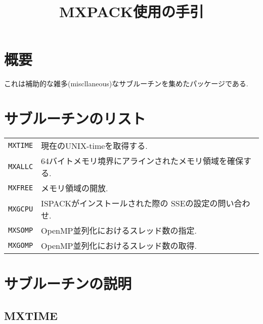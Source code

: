 \documentclass[a4j]{jsarticle}
\title{MXPACK使用の手引}
\author{}
\date{}
\begin{document}
\maketitle

\section{概要}

これは補助的な雑多(miscllaneous)なサブルーチンを集めたパッケージである.


\section{サブルーチンのリスト}

\vspace{1em}
\begin{tabular}{ll}
\texttt{MXTIME} & 現在のUNIX-timeを取得する.\\
\texttt{MXALLC} & 64バイトメモリ境界にアラインされたメモリ領域を確保する.\\
\texttt{MXFREE} & メモリ領域の開放.\\
\texttt{MXGCPU} & ISPACKがインストールされた際の SSEの設定の問い合わせ.\\
\texttt{MXSOMP} & OpenMP並列化におけるスレッド数の指定.\\
\texttt{MXGOMP} & OpenMP並列化におけるスレッド数の取得.
\end{tabular}


\section{サブルーチンの説明}

\subsection{MXTIME}
\end{document}
